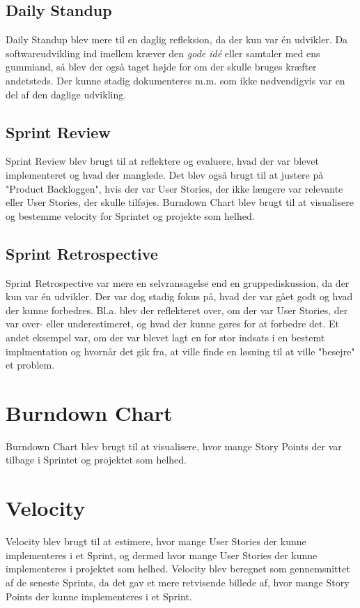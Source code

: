 \subsection{Daily Standup}
Daily Standup blev mere til en daglig refleksion, da der kun var én udvikler. Da softwareudvikling ind imellem kræver den \emph{gode idé} eller samtaler med ens gummiand, så blev der også taget højde for om der skulle bruges kræfter andetsteds.
Der kunne stadig dokumenteres m.m. som ikke nødvendigvis var en del af den daglige udvikling.

\subsection{Sprint Review}
Sprint Review blev brugt til at reflektere og evaluere, hvad der var blevet implementeret og hvad der manglede. Det blev også brugt til at justere på "Product Backloggen", hvis der var User Stories, der ikke længere var relevante eller User Stories, der skulle tilføjes.
Burndown Chart blev brugt til at visualisere og bestemme velocity for Sprintet og projekte som helhed.

\subsection{Sprint Retrospective}
Sprint Retrospective var mere en selvransagelse end en gruppediskussion, da der kun var én udvikler. Der var dog stadig fokus på, hvad der var gået godt og hvad der kunne forbedres. 
Bl.a. blev der reflekteret over, om der var User Stories, der var over- eller underestimeret, og hvad der kunne gøres for at forbedre det. 
Et andet eksempel var, om der var blevet lagt en for stor indsats i en bestemt implmentation og hvornår det gik fra, at ville finde en løsning til at ville "besejre" et problem.

\section{Burndown Chart}
Burndown Chart blev brugt til at visualisere, hvor mange Story Points der var tilbage i Sprintet og projektet som helhed.

\section{Velocity}
Velocity blev brugt til at estimere, hvor mange User Stories der kunne implementeres i et Sprint, og dermed hvor mange User Stories der kunne implementeres i projektet som helhed.
Velocity blev beregnet som gennemsnittet af de seneste Sprints, da det gav et mere retvisende billede af, hvor mange Story Points der kunne implementeres i et Sprint.